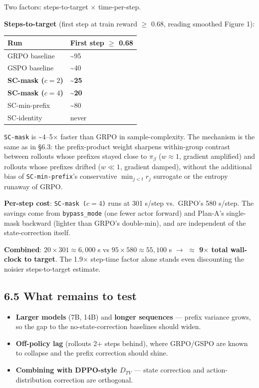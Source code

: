 \documentclass[11pt,a4paper]{article}
\theoremstyle{remark}
\begin{document}
Two factors: steps-to-target $\times$ time-per-step.

\textbf{Steps-to-target} (first step at train reward $\geq$ 0.68, reading smoothed Figure 1):

\begin{table}[H]\centering\small
\begin{tabularx}{\textwidth}{LL}
\toprule
\textbf{Run} & \textbf{First step $\geq$ 0.68} \\
\midrule
GRPO baseline & \textasciitilde{}95 \\
GSPO baseline & \textasciitilde{}40 \\
\textbf{SC-mask ($c{=}2$)} & \textbf{\textasciitilde{}25} \\
\textbf{SC-mask ($c{=}4$)} & \textbf{\textasciitilde{}20} \\
SC-min-prefix & \textasciitilde{}80 \\
SC-identity & never \\
\bottomrule
\end{tabularx}
\end{table}

\texttt{SC-mask} is \textasciitilde{}4--5$\times$ faster than GRPO in sample-complexity. The mechanism is the same as in §6.3: the prefix-product weight sharpens within-group contrast between rollouts whose prefixes stayed close to $\pi_\beta$ ($w\!\approx\!1$, gradient amplified) and rollouts whose prefixes drifted ($w\!\ll\!1$, gradient damped), without the additional bias of \texttt{SC-min-prefix}'s conservative $\min_{j<t} r_j$ surrogate or the entropy runaway of GRPO.

\textbf{Per-step cost}: \texttt{SC-mask ($c{=}4$)} runs at 301 s/step vs.\ GRPO's 580 s/step. The savings come from \texttt{bypass\_mode} (one fewer actor forward) and Plan-A's single-mask backward (lighter than GRPO's double-min), and are independent of the state-correction itself.

\textbf{Combined}: $20\!\times\!301\approx 6{,}000$ s vs $95\!\times\!580\approx 55{,}100$ s $\rightarrow$ \textbf{$\approx$ 9$\times$ total wall-clock to target}. The 1.9$\times$ step-time factor alone stands even discounting the noisier steps-to-target estimate.

\subsection*{6.5 What remains to test}

\begin{itemize}[leftmargin=1.2em]
\item \textbf{Larger models} (7B, 14B) and \textbf{longer sequences} --- prefix variance grows, so the gap to the no-state-correction baselines should widen.
\item \textbf{Off-policy lag} (rollouts 2+ steps behind), where GRPO/GSPO are known to collapse and the prefix correction should shine.
\item \textbf{Combining with DPPO-style $D_{TV}$} --- state correction and action-distribution correction are orthogonal.
\end{itemize}
\end{document}
